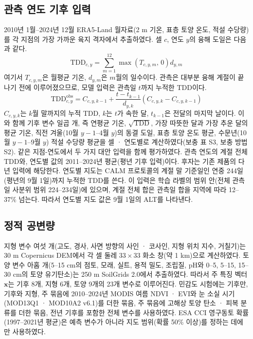 \subsection{관측 연도 기후 입력}
2010년 1월--2024년 12월 ERA5-Land 월자료\cite{munozsabater2021_era5_land}(2 m 기온, 표층 토양 온도, 적설 수당량)를 각 지점의 가장 가까운 육지 격자에서 추출하였다. 셀 $c$, 연도 $y$의 융해 도일은 다음과 같다.
\begin{equation}
\mathrm{TDD}_{c,y} = \sum_{m=1}^{12} \max\!\left(T_{c,y,m},\,0\right) d_{y,m}
\label{eq:tdd}
\end{equation}
여기서 $T_{c,y,m}$은 월평균 기온, $d_{y,m}$은 $m$월의 일수이다. 관측은 대부분 융해 계절이 끝나기 전에 이루어졌으므로, 모델 입력은 관측일 $t$까지 누적한 TDD이다.
\begin{equation}
\mathrm{TDD}^{\mathrm{obs}}_{c,y} = C_{c,y,k-1} + \frac{t - t_{k-1}}{d_{y,k}} \left( C_{c,y,k} - C_{c,y,k-1} \right)
\label{eq:tddobs}
\end{equation}
$C_{c,y,k}$는 $k$월 말까지의 누적 TDD, $k$는 $t$가 속한 달, $t_{k-1}$은 전달의 마지막 날이다. 이와 함께 기후 변수 일곱 개, 즉 연평균 기온, $\sqrt{\mathrm{TDD}}$, 가장 따뜻한 달과 가장 추운 달의 평균 기온, 직전 겨울(10월 $y-1$--4월 $y$)의 동결 도일, 표층 토양 온도 평균, 수문년(10월 $y-1$--9월 $y$) 적설 수당량 평균을 셀 · 연도별로 계산하였다(보충 표 S3, 보충 방법 S2). 같은 지점-연도에서 두 가지 대안 입력을 함께 평가하였다. 관측 연도의 계절 전체 TDD와, 연도별 값의 2011--2024년 평균(평년 기후 입력)이다. 후자는 기존 제품의 다년 입력에 해당한다. 연도별 지도는 CALM 프로토콜의 계절 말 기준일인 연중 244일(평년의 9월 1일)까지 누적한 TDD를 쓴다. 이 입력은 학습 라벨의 범위 안(전체 관측일 사분위 범위 224--234일)에 있으며, 계절 전체 합은 관측일 합을 지역에 따라 12--37\% 넘는다. 따라서 연도별 지도 값은 9월 1일의 ALT를 나타낸다.

\subsection{정적 공변량}
지형 변수 여섯 개(고도, 경사, 사면 방향의 사인 · 코사인, 지형 위치 지수, 거칠기)는 30 m Copernicus DEM\cite{CopDEM2021}에서 각 셀 둘레 $33\times33$ 화소 창(약 1 km)으로 계산하였다. 토양 변수 아홉 개(5--15 cm의 점토, 모래, 실트, 용적 밀도, 조립질, pH와 0--5, 5--15, 15--30 cm의 토양 유기탄소)는 250 m SoilGrids 2.0\cite{Poggio2021}에서 추출하였다. 따라서 주 특징 벡터 $\mathbf{x}$는 기후 8개, 지형 6개, 토양 9개의 23개 변수로 이루어진다. 민감도 시험에는 기후만, 기후와 지형, 주 묶음에 2010--2024년 MODIS 여름 NDVI · EVI와 눈 소실 시기(MOD13Q1 · MOD10A2 v6.1)\cite{Didan2021,HallRiggs2021}를 더한 묶음, 주 묶음에 고해상 토양 탄소 · 피복 분류\cite{Palmtag2022}를 더한 묶음, 전년 기후를 포함한 전체 변수를 사용하였다. ESA CCI 영구동토 확률(1997--2021년 평균)\cite{Westermann2024}은 예측 변수가 아니라 지도 범위(확률 50\% 이상)를 정하는 데에만 사용하였다.

